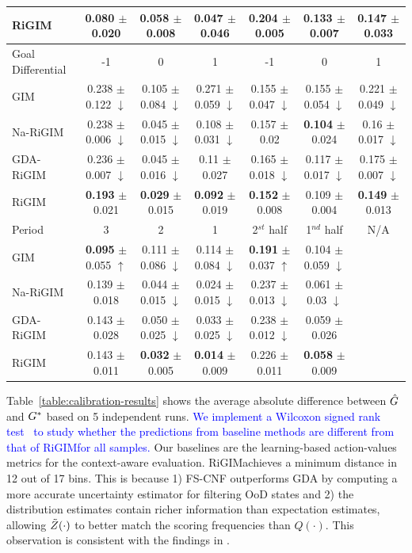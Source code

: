 \documentclass{article}
\newcommand{\sys}{RiGIM}
\newcommand{\goal}{g}
\newcommand{\system}{\sys\;}
\begin{document}
\begin{table}[htbp]
{\begin{tabular}{l|ccc:ccc}
RiGIM & {\bf 0.080} $\pm$ 0.020 & {\bf 0.058} $\pm$ 0.008 & 0.047 $\pm$ 0.046 & {\bf 0.204} $\pm$ 0.005 & 0.133 $\pm$ 0.007 & {\bf 0.147} $\pm$ 0.033\\ \hline\hline
 Goal Differential & -1 & 0 & 1 & -1 & 0 & 1 \\\hline
GIM  & 0.238 $\pm$ 0.122 $\downarrow$ & 0.105 $\pm$ 0.084 $\downarrow$ & 0.271 $\pm$ 0.059 $\downarrow$ & 0.155 $\pm$ 0.047 $\downarrow$ & 0.155 $\pm$ 0.054 $\downarrow$ & 0.221 $\pm$ 0.049 $\downarrow$ \\
Na-RiGIM  & 0.238 $\pm$ 0.006 $\downarrow$ & 0.045 $\pm$ 0.015 $\downarrow$ & 0.108 $\pm$ 0.031 $\downarrow$ & 0.157 $\pm$ 0.02 & {\bf 0.104} $\pm$ 0.024 & 0.16 $\pm$ 0.017 $\downarrow$\\
GDA-RiGIM & 0.236 $\pm$ 0.007 $\downarrow$ & 0.045 $\pm$ 0.016 $\downarrow$ & 0.11 $\pm$ 0.027 & 0.165 $\pm$ 0.018 $\downarrow$ & 0.117 $\pm$ 0.017 $\downarrow$ & 0.175 $\pm$ 0.007 $\downarrow$\\
RiGIM & {\bf 0.193} $\pm$ 0.021 & {\bf 0.029} $\pm$ 0.015 & {\bf 0.092} $\pm$ 0.019 & {\bf 0.152} $\pm$ 0.008 & 0.109 $\pm$ 0.004 & {\bf 0.149} $\pm$ 0.013\\ \hline\hline
Period & 3 & 2 & 1 & 2$^{st}$ half
& 1$^{nd}$ half & N/A \\\hline
GIM & {\bf 0.095} $\pm$ 0.055 $\uparrow$ & 0.111 $\pm$ 0.086 $\downarrow$ & 0.114 $\pm$ 0.084 $\downarrow$ & {\bf 0.191} $\pm$ 0.037 $\uparrow$ & 0.104 $\pm$ 0.059 $\downarrow$ \\
Na-RiGIM  & 0.139 $\pm$ 0.018 & 0.044 $\pm$ 0.015 $\downarrow$ & 0.024 $\pm$ 0.015 $\downarrow$ & 0.237 $\pm$ 0.013 $\downarrow$ & 0.061 $\pm$ 0.03 $\downarrow$ \\
GDA-RiGIM & 0.143 $\pm$ 0.028 & 0.050 $\pm$ 0.025 $\downarrow$ & 0.033 $\pm$ 0.025 $\downarrow$ & 0.238 $\pm$ 0.012 $\downarrow$ & 0.059 $\pm$ 0.026\\
RiGIM & 0.143 $\pm$ 0.011 & {\bf 0.032} $\pm$ 0.005 & {\bf 0.014} $\pm$ 0.009  & 0.226 $\pm$ 0.011 & {\bf 0.058} $\pm$ 0.009\\ \bottomrule
\end{tabular}
}
\end{table}
\vspace{-0.1in}
Table~\ref{table:calibration-results} shows the average absolute difference between $\hat{\MakeUppercase{\goal}}$ and $\MakeUppercase{\goal}^{*}$ based on 5 independent runs. 
\textcolor{blue}{We implement a Wilcoxon signed rank test~\cite{conover1999practical} to study whether the predictions from baseline methods are different from that of \system for all samples.}
Our baselines are the learning-based action-values metrics for the context-aware evaluation. \system achieves a minimum distance in 12 out of 17 bins. This is because 1) FS-CNF outperforms GDA by computing a more accurate uncertainty estimator for filtering OoD states and 2) the distribution estimates contain richer information than expectation estimates, allowing $\Tilde{Z}(\cdot)$ to better match the scoring frequencies than $Q(\cdot)$. This observation is consistent with the findings in \cite{bellemare2017distributional}.
\end{document}
